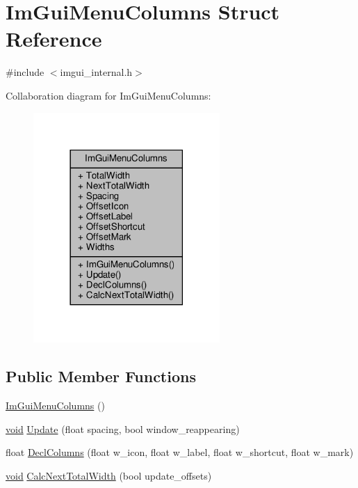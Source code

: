 \hypertarget{structImGuiMenuColumns}{}\section{Im\+Gui\+Menu\+Columns Struct Reference}
\label{structImGuiMenuColumns}


{\ttfamily \#include $<$imgui\+\_\+internal.\+h$>$}



Collaboration diagram for Im\+Gui\+Menu\+Columns\+:
\nopagebreak
\begin{figure}[H]
\begin{center}
\leavevmode
\includegraphics[width=201pt]{structImGuiMenuColumns__coll__graph}
\end{center}
\end{figure}
\subsection*{Public Member Functions}
\begin{DoxyCompactItemize}
\item 
\hyperlink{structImGuiMenuColumns_ac476e04a9d907280b3ccdfc429845803}{Im\+Gui\+Menu\+Columns} ()
\item 
\hyperlink{imgui__impl__opengl3__loader_8h_ac668e7cffd9e2e9cfee428b9b2f34fa7}{void} \hyperlink{structImGuiMenuColumns_aae99240b9c8e9380f829921da5e337f2}{Update} (float spacing, bool window\+\_\+reappearing)
\item 
float \hyperlink{structImGuiMenuColumns_a85fedb03fec0c73555220b74ceaa2bb8}{Decl\+Columns} (float w\+\_\+icon, float w\+\_\+label, float w\+\_\+shortcut, float w\+\_\+mark)
\item 
\hyperlink{imgui__impl__opengl3__loader_8h_ac668e7cffd9e2e9cfee428b9b2f34fa7}{void} \hyperlink{structImGuiMenuColumns_a76bf28ca1ad728afce787f48e1645138}{Calc\+Next\+Total\+Width} (bool update\+\_\+offsets)
\end{DoxyCompactItemize}
